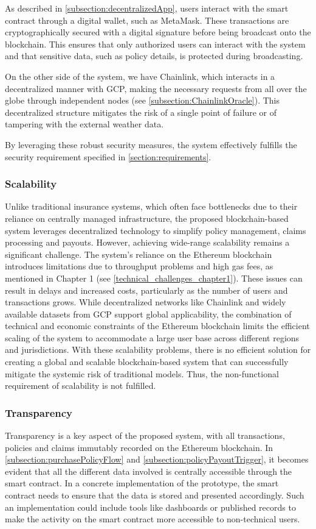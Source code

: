 As described in \cref{subsection:decentralizedApp}, users interact with the smart contract through a digital wallet, such as MetaMask. These transactions are cryptographically secured with a digital signature before being broadcast onto the blockchain. This ensures that only authorized users can interact with the system and that sensitive data, such as policy details, is protected during broadcasting.

On the other side of the system, we have Chainlink, which interacts in a decentralized manner with GCP, making the necessary requests from all over the globe through independent nodes (see \cref{subsection:ChainlinkOracle}). This decentralized structure mitigates the risk of a single point of failure or of tampering with the external weather data.

By leveraging these robust security measures, the system effectively fulfills the security requirement specified in \cref{section:requirements}.

\subsubsection{Scalability}\label{Scalability_requiremnt}
Unlike traditional insurance systems, which often face bottlenecks due to their reliance on centrally managed infrastructure, the proposed blockchain-based system leverages decentralized technology to simplify policy management, claims processing and payouts. However, achieving wide-range scalability remains a significant challenge. The system's reliance on the Ethereum blockchain introduces limitations due to throughput problems and high gas fees, as mentioned in Chapter 1 (see \cref{technical_challenges_chapter1}). These issues can result in delays and increased costs, particularly as the number of users and transactions grows. While decentralized networks like Chainlink and widely available datasets from GCP support global applicability, the combination of technical and economic constraints of the Ethereum blockchain limits the efficient scaling of the system to accommodate a large user base across different regions and jurisdictions. With these scalability problems, there is no efficient solution for creating a global and scalable blockchain-based system that can successfully mitigate the systemic risk of traditional models. Thus, the non-functional requirement of scalability is not fulfilled.

\subsubsection{Transparency}
Transparency is a key aspect of the proposed system, with all transactions, policies and claims immutably recorded on the Ethereum blockchain. In \cref{subsection:purchasePolicyFlow} and \cref{subsection:policyPayoutTrigger}, it becomes evident that all the different data involved is centrally accessible through the smart contract. In a concrete implementation of the prototype, the smart contract needs to ensure that the data is stored and presented accordingly. Such an implementation could include tools like dashboards or published records to make the activity on the smart contract more accessible to non-technical users.

